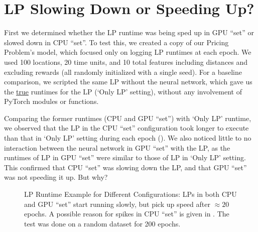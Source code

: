 \section{LP Slowing Down or Speeding Up?} \label{app:LP Slowing Down or Speeding Up?}
First we determined whether the LP runtime was being sped up in GPU ``set'' or slowed down in CPU ``set''. To test this, we created a copy of our Pricing Problem's model, which focused only on logging LP runtimes at each epoch. We used 100 locations, 20 time units, and 10 total features including distances and excluding rewards (all randomly initialized with a single seed). For a baseline comparison, we scripted the same LP without the neural network, which gave us the \underline{true} runtimes for the LP (`Only LP' setting), without any involvement of PyTorch modules or functions. 

Comparing the former runtimes (CPU and GPU ``set'') with `Only LP' runtime, we observed that the LP in the CPU ``set'' configuration took longer to execute than that in `Only LP' setting during each epoch (). We also noticed little to no interaction between the neural network in GPU ``set'' with the LP, as the runtimes of LP in GPU ``set'' were similar to those of LP in `Only LP' setting. This confirmed that CPU ``set'' was slowing down the LP, and that GPU ``set'' was not speeding it up. But why?
\begin{figure}[!htbp]
    \centering
    \caption[LP Runtime Example for Different Configurations]{LP Runtime Example for Different Configurations: LPs in both CPU and GPU ``set'' start running slowly, but pick up speed after $\approx 20$ epochs. A possible reason for spikes in CPU ``set'' is given in . The test was done on a random dataset for 200 epochs.}
    \label{fig:LP Runtime Example for Different Configurations}
\end{figure}

